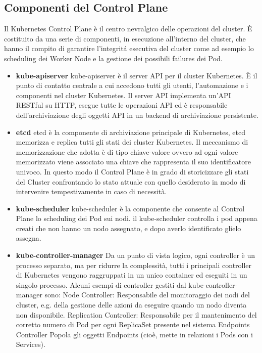 \subsection{Componenti del Control Plane}
Il Kubernetes Control Plane è il centro nevralgico delle operazioni del cluster. È costituito da una serie di componenti, in esecuzione all'interno del cluster, che hanno il compito di garantire l'integritá esecutiva del cluster come ad esempio lo scheduling dei Worker Node e la gestione dei possibili failures dei Pod.
\begin{itemize}
    \item\textbf{kube-apiserver}
    kube-apiserver è il server API per il cluster Kubernetes. È il punto di contatto centrale a cui accedono tutti gli utenti, l'automazione e i componenti nel cluster Kubernetes. Il server API implementa un'API RESTful su HTTP, esegue tutte le operazioni API ed è responsabile dell'archiviazione degli oggetti API in un backend di archiviazione persistente.
    \item\textbf{etcd}
    etcd è la componente di archiviazione principale di Kubernetes, etcd memorizza e replica tutti gli stati dei cluster Kubernetes. Il meccanismo di memorizzazione che adotta è di tipo chiave-valore ovvero ad ogni valore memorizzato viene associato una chiave che rappresenta il suo identificatore univoco. In questo modo il Control Plane è in grado di storicizzare gli stati del Cluster confrontando lo stato attuale con quello desiderato in modo di intervenire tempestivamente in caso di necessità.
    \item\textbf{kube-scheduler}
    kube-scheduler è la componente che consente al Control Plane lo scheduling dei Pod sui nodi. il kube-scheduler controlla i pod appena creati che non hanno un nodo assegnato, e dopo averlo identificato glielo assegna. 
    \item\textbf{kube-controller-manager} 
    Da un punto di vista logico, ogni controller è un processo separato, ma per ridurre la complessità, tutti i principali controller di Kubernetes vengono raggruppati in un unico container ed eseguiti in un singolo processo.
    Alcuni esempi di controller gestiti dal kube-controller-manager sono:
    Node Controller: Responsabile del monitoraggio dei nodi del cluster, e.g. della gestione delle azioni da eseguire quando un nodo diventa non disponibile.
    Replication Controller: Responsabile per il mantenimento del corretto numero di Pod per ogni ReplicaSet presente nel sistema
    Endpoints Controller Popola gli oggetti Endpoints (cioè, mette in relazioni i Pods con i Services).

\end{itemize}
